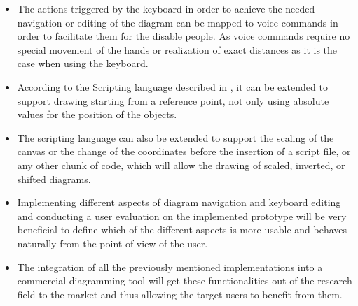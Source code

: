 \begin{itemize}
\item The actions triggered by the keyboard in order to achieve the needed navigation or editing of the diagram can be mapped to voice commands in order to facilitate them for the disable people. As voice commands require no special movement of the hands or realization of exact distances as it is the case when using the keyboard.

\item According to the Scripting language described in , it can be extended to support drawing starting from a reference point, not only using absolute values for the position of the objects.

\item The scripting language can also be extended to support the scaling of the canvas or the change of the coordinates before the insertion of a script file, or any other chunk of code, which will allow the drawing of scaled, inverted, or shifted diagrams.

\item Implementing different aspects of diagram navigation and keyboard editing and conducting a user evaluation on the implemented prototype will be very beneficial to define which of the different aspects is more usable and behaves naturally from the point of view of the user.

\item The integration of all the previously mentioned implementations into a commercial diagramming tool will get these functionalities out of the research field to the market and thus allowing the target users to benefit from them.
\end{itemize}
